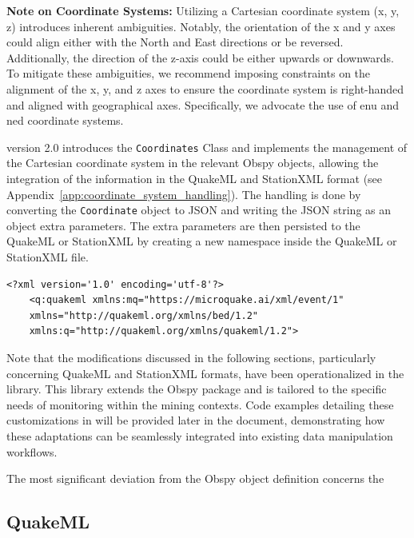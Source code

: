 \begin{mdframed}[backgroundcolor=gray!20]
\textbf{Note on Coordinate Systems:} Utilizing a Cartesian coordinate system (x, y, z) introduces inherent ambiguities. Notably, the orientation of the x and y axes could align either with the North and East directions or be reversed. Additionally, the direction of the z-axis could be either upwards or downwards. To mitigate these ambiguities, we recommend imposing constraints on the alignment of the x, y, and z axes to ensure the coordinate system is right-handed and aligned with geographical axes. Specifically, we advocate the use of \gls{enu} and \gls{ned} coordinate systems.

\muquake version 2.0 introduces the \texttt{Coordinates} Class and implements the management of the Cartesian coordinate system in the relevant Obspy objects, allowing the integration of the information in the QuakeML and StationXML format (see Appendix~\ref{app:coordinate_system_handling}). The handling is done by converting the \texttt{Coordinate} object to JSON and writing the JSON string as an object extra parameters. The extra parameters are then persisted to the QuakeML or StationXML by creating a new namespace inside the QuakeML or StationXML file. 

\begin{verbatim}
<?xml version='1.0' encoding='utf-8'?>
    <q:quakeml xmlns:mq="https://microquake.ai/xml/event/1" 
    xmlns="http://quakeml.org/xmlns/bed/1.2" 
    xmlns:q="http://quakeml.org/xmlns/quakeml/1.2">
\end{verbatim}

\end{mdframed}


Note that the modifications discussed in the following sections, particularly concerning QuakeML and StationXML formats, have been operationalized in the \muquake library. This library extends the Obspy package and is tailored to the specific needs of \museismic monitoring within the mining contexts. Code examples detailing these customizations in \muquake will be provided later in the document, demonstrating how these adaptations can be seamlessly integrated into existing data manipulation workflows.


The most significant deviation from the Obspy object definition concerns the 


\subsection{QuakeML}
